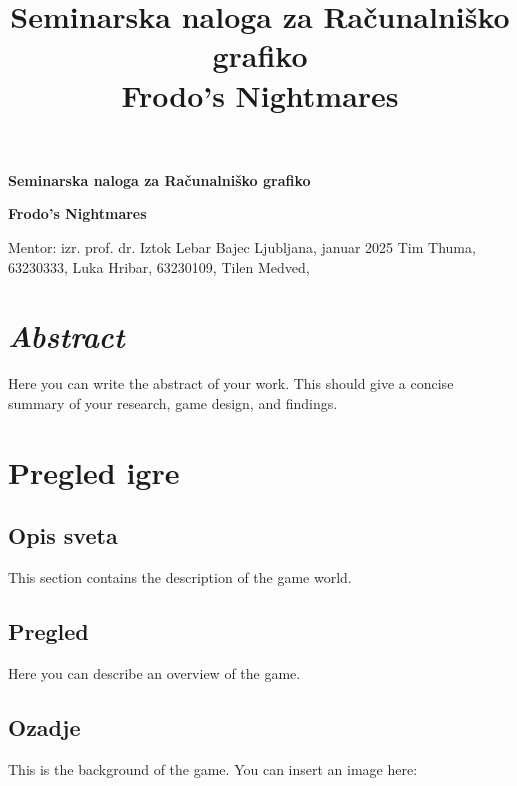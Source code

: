 \documentclass[a4paper,12pt]{article}
\title{\vspace{-4cm}Seminarska naloga za Računalniško grafiko\\[0.5cm] \huge \textbf{Frodo's Nightmares} \vspace{-1cm}}
\author{}
\date{}
\begin{document}
\begin{titlepage}
    \begin{center}
        \vspace*{2cm}

        \textbf{\Huge{Seminarska naloga za Ra\v{c}unalni\v{s}ko grafiko}}

        \vspace{0.5cm}

        \textbf{\LARGE{Frodo's Nightmares}}

        \vfill

        \hspace*{-1.5cm} Mentor: izr. prof. dr. Iztok Lebar Bajec
        \hspace*{2.5cm} Ljubljana, januar 2025
        \hspace*{2cm} Tim Thuma, 63230333, Luka Hribar, 63230109, Tilen Medved, 
    \end{center}
\end{titlepage}

\section*{\textit{Abstract}}

\noindent Here you can write the abstract of your work. This should give a concise summary of your research, game design, and findings.

\newpage

\section{Pregled igre}

\subsection{Opis sveta}
\noindent This section contains the description of the game world.

\subsection{Pregled}
\noindent Here you can describe an overview of the game.

\subsection{Ozadje}
\noindent This is the background of the game. You can insert an image here:
\end{document}
